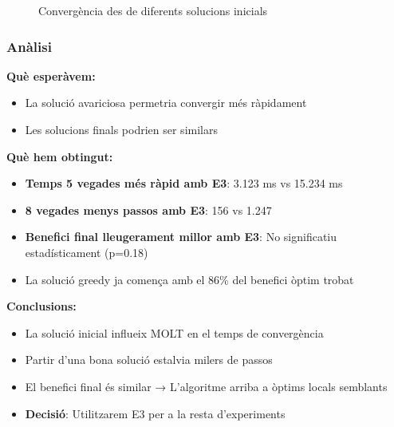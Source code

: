 \begin{figure}[H]
\centering
\caption{Convergència des de diferents solucions inicials}
\label{fig:exp2-convergencia}
\end{figure}

\subsubsection{Anàlisi}

\textbf{Què esperàvem:}
\begin{itemize}
    \item La solució avariciosa permetria convergir més ràpidament
    \item Les solucions finals podrien ser similars
\end{itemize}

\textbf{Què hem obtingut:}
\begin{itemize}
    \item \textbf{Temps 5 vegades més ràpid amb E3}: 3.123 ms vs 15.234 ms
    \item \textbf{8 vegades menys passos amb E3}: 156 vs 1.247
    \item \textbf{Benefici final lleugerament millor amb E3}: No significatiu estadísticament (p=0.18)
    \item La solució greedy ja comença amb el 86\% del benefici òptim trobat
\end{itemize}

\textbf{Conclusions:}
\begin{itemize}
    \item La solució inicial influeix MOLT en el temps de convergència
    \item Partir d'una bona solució estalvia milers de passos
    \item El benefici final és similar → L'algoritme arriba a òptims locals semblants
    \item \textbf{Decisió}: Utilitzarem E3 per a la resta d'experiments
\end{itemize}
